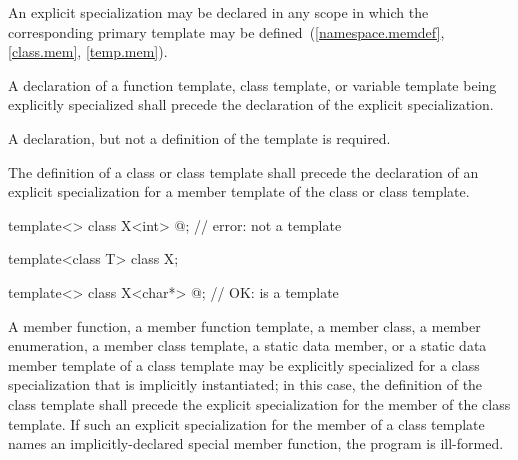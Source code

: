 \pnum
An explicit specialization
may be declared in any scope in which the corresponding primary template
may be defined~(\ref{namespace.memdef}, \ref{class.mem}, \ref{temp.mem}).

\pnum
A declaration of a function template, class template, or variable template being explicitly
specialized shall precede the declaration of
the explicit
specialization.
\begin{note}
A declaration, but not a definition of the template is required.
\end{note}
The definition of a class or class template shall precede the
declaration of an explicit specialization for a member template of the class
or class template.
\begin{example}
\begin{codeblock}
template<> class X<int> { @\commentellip@ };          // error:  not a template

template<class T> class X;

template<> class X<char*> { @\commentellip@ };        // OK:  is a template
\end{codeblock}
\end{example}

\pnum
A member function, a member function template, a member class,
a member enumeration, a
member class template,
a static data member, or a static data member template of a class template
may be explicitly specialized for a class specialization that is implicitly
instantiated;
in this case, the definition of the class template shall
precede the explicit specialization for the member of the class
template.
If such an explicit specialization for the member of a class template names an
implicitly-declared special member function,
the program is ill-formed.


